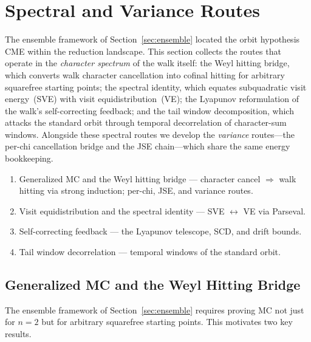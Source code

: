 \section{Spectral and Variance Routes}
\label{sec:spectral-routes}

The ensemble framework of Section~\ref{sec:ensemble} located the orbit
hypothesis CME within the reduction landscape.  This section collects the routes that
operate in the \emph{character spectrum} of the walk itself: the Weyl
hitting bridge, which converts walk character cancellation into
cofinal hitting for arbitrary squarefree starting points; the spectral
identity, which equates subquadratic visit energy~(SVE) with visit
equidistribution~(VE); the Lyapunov reformulation of the walk's
self-correcting feedback; and the tail window decomposition, which
attacks the standard orbit through temporal decorrelation of
character-sum windows.  Alongside these spectral routes we develop the
\emph{variance} routes---the per-chi cancellation bridge and the JSE
chain---which share the same energy bookkeeping.

\begin{roadmap}
\begin{enumerate}[nosep,leftmargin=*]
\item[\S\ref{sec:weyl-bridge}] Generalized MC and the Weyl hitting bridge --- character cancel $\Rightarrow$ walk hitting via strong induction; per-chi, JSE, and variance routes.
\item[\S\ref{sec:visit-eqd}] Visit equidistribution and the spectral identity --- SVE $\leftrightarrow$ VE via Parseval.
\item[\S\ref{sec:self-correcting}] Self-correcting feedback --- the Lyapunov telescope, SCD, and drift bounds.
\item[\S\ref{sec:twd}] Tail window decorrelation --- temporal windows of the standard orbit.
\end{enumerate}
\end{roadmap}

\subsection{Generalized MC and the Weyl Hitting Bridge}
\label{sec:gen-mc}
\label{sec:weyl-bridge}

The ensemble framework of Section~\ref{sec:ensemble} requires proving
MC not just for $n = 2$ but for arbitrary squarefree starting points.
This motivates two key results.

